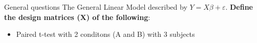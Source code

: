 \documentclass{beamer}
\begin{document}
\begin{frame}{General questions}
  The General Linear Model described by $Y=X\beta+\varepsilon$. \textbf{Define the design matrices (X) of the following}:

  \begin{itemize}
    \item Paired t-test with 2 conditons (A and B) with 3 subjects
  \end{itemize}

\end{frame}
\end{document}
